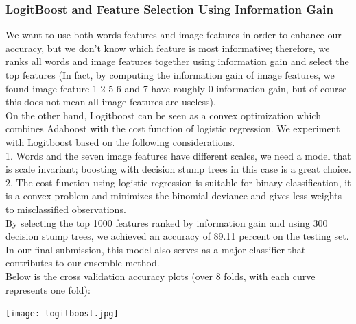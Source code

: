 \subsubsection{LogitBoost and Feature Selection Using Information Gain}
 We want to use both words features and image features in order to enhance our accuracy, but we don't know which feature is most informative; therefore, we ranks all words and image features together using information gain and select the top features (In fact, by computing the information gain of image features, we found image feature 1 2 5 6 and 7 have roughly 0 information gain, but of course this does not mean all image features are useless).\\
On the other hand, Logitboost can be seen as a convex optimization which combines Adaboost with the cost function of logistic regression. We experiment with Logitboost based on the following considerations.\\
1. Words and the seven image features have different scales, we need a model that is scale invariant; boosting with decision stump trees in this case is a great choice.\\
2. The cost function using logistic regression is suitable for binary classification, it is a convex problem and minimizes the binomial deviance and gives less weights to misclassified observations.\\
By selecting the top 1000 features ranked by information gain and using 300 decision stump trees, we achieved an accuracy of 89.11 percent on the testing set.\\
In our final submission, this model also serves as a major classifier that contributes to our ensemble method.\\
Below is the cross validation accuracy plots (over 8 folds, with each curve represents one fold):\\
\begin{center}
\texttt{[image: logitboost.jpg]}
\end{center}
